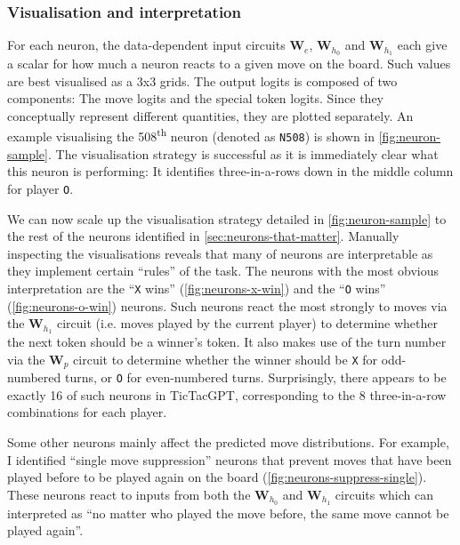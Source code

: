 \documentclass{article}
\newcommand{\ttgpt}{TicTacGPT\xspace}
\newcommand{\m}[1]{\mathbf{\bm{#1}}}
\newcounter{num}
\begin{document}
\subsubsection{Visualisation and interpretation}



For each neuron, the data-dependent input circuits $\m{W}_e$, $\m{W}_{h_0}$ and $\m{W}_{h_1}$ each give a scalar for how much a neuron reacts to a given move on the board. Such values are best visualised as a 3x3 grids. The output logits is composed of two components: The move logits and the special token logits. Since they conceptually represent different quantities, they are plotted separately. An example visualising the 508\textsuperscript{th} neuron (denoted as \texttt{N508}) is shown in \cref{fig:neuron-sample}. The visualisation strategy is successful as it is immediately clear what this neuron is performing: It identifies three-in-a-rows down in the middle column for player \texttt{O}.



We can now scale up the visualisation strategy detailed in \cref{fig:neuron-sample} to the rest of the neurons identified in \cref{sec:neurons-that-matter}. Manually inspecting the visualisations reveals that many of neurons are interpretable as they implement certain ``rules'' of the task. The neurons with the most obvious interpretation are the ``\texttt{X} wins'' (\cref{fig:neurons-x-win}) and the ``\texttt{O} wins'' (\cref{fig:neurons-o-win}) neurons. Such neurons react the most strongly to moves via the $\m{W}_{h_1}$ circuit (i.e. moves played by the current player) to determine whether the next token should be a winner's token. It also makes use of the turn number via the $\m{W}_p$ circuit to determine whether the winner should be \texttt{X} for odd-numbered turns, or \texttt{O} for even-numbered turns. Surprisingly, there appears to be exactly 16 of such neurons in \ttgpt, corresponding to the 8 three-in-a-row combinations for each player.

Some other neurons mainly affect the predicted move distributions. For example, I identified ``single move suppression'' neurons that prevent moves that have been played before to be played again on the board (\cref{fig:neurons-suppress-single}). These neurons react to inputs from both the $\m{W}_{h_0}$ and $\m{W}_{h_1}$ circuits which can interpreted as ``no matter who played the move before, the same move cannot be played again''.
\end{document}

